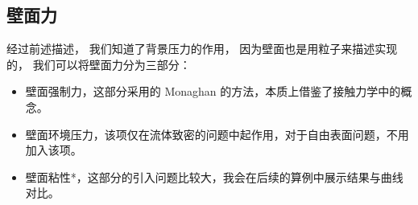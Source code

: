 \subsection{壁面力}

\begin{frame}
    经过前述描述，
    我们知道了背景压力的作用，
    因为壁面也是用粒子来描述实现的，
    我们可以将壁面力分为三部分：
    \begin{itemize}
        \item 壁面强制力，这部分采用的 Monaghan 的方法，本质上借鉴了接触力学中的概念。
        \item 壁面环境压力，该项仅在流体致密的问题中起作用，对于自由表面问题，不用加入该项。
        \item 壁面粘性*，这部分的引入问题比较大，我会在后续的算例中展示结果与曲线对比。
    \end{itemize}
    \begin{figure}[H]
        \centering
    \end{figure}
\end{frame}


